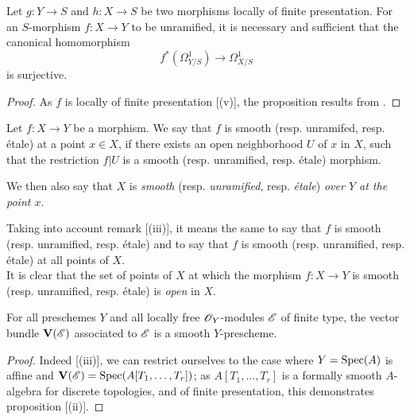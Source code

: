 \begin{proposition}[17.3.6]
\label{IV.17.3.6}
Let $g: Y \to S$ and $h: X \to S$ be two morphisms locally of finite presentation.
For an $S$-morphism $f: X \to Y$ to be unramified, it is necessary and sufficient that the canonical homomorphism 
\[
 f^*(\Omega^1 _{Y/S}) \to \Omega^1 _{X/S}
\] is surjective.
\end{proposition}

\begin{proof}
As $f$ is locally of finite presentation [(v)], the proposition results from .
\end{proof}

\begin{definition}[17.3.7]
\label{IV.17.3.7}
Let $f: X \to Y$ be a morphism. 
We say that $f$ is smooth (resp. unramifed, resp. \'etale) at a point $x \in X$, if there exists an open neighborhood $U$ of $x$ in $X$, such that the restriction $f|U$ is a smooth (resp. unramified, resp. \'etale) morphism.
\end{definition}

We then also say that $X$ is \emph{smooth} (resp. \emph{unramified}, resp. \emph{\'etale}) \emph{over $Y$ at the point $x$}.

Taking into account remark [(iii)], it means the same to say that $f$ is smooth (resp. unramified, resp. \'etale) and to say that $f$ is smooth (resp. unramified, resp. \'etale) at all points of $X$.\\
It is clear that the set of points of $X$ at which the morphism $f : X \to Y$ is smooth (resp. unramified, resp. \'etale) is \emph{open} in $X$.

\begin{proposition}[17.3.8]
\label{IV.17.3.8}
For all preschemes $Y$ and all locally free $\mathscr{O}_Y$-modules $\mathscr{E}$ of finite type, the vector bundle $\mathbf{V}(\mathscr{E})$  associated to $\mathscr{E}$ is a smooth $Y$-prescheme.
\end{proposition}

\begin{proof}
Indeed [(iii)], we can restrict ourselves to the case where $Y = {\mathop{\mathrm{Spec}}\nolimits}(A)$ is affine and $\mathbf{V}(\mathscr{E}) = {\mathop{\mathrm{Spec}}\nolimits}(A[T_1, \ldots, T_r])$; as $A[T_1, \ldots, T_r]$ is a formally smooth $A$-algebra for discrete topologies, and of finite presentation, this demonstrates proposition [(ii)].  
\end{proof}

